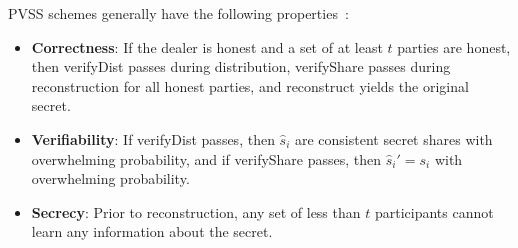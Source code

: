 PVSS schemes generally have the following properties~\cite{pvss_pairings_heidervand}:
\begin{itemize}
    \item \textbf{Correctness}:
    If the dealer is honest and a set of at least $t$ parties are honest, then \textsf{verifyDist} passes during distribution, \textsf{verifyShare} passes during reconstruction for all honest parties, and \textsf{reconstruct} yields the original secret.
    \item \textbf{Verifiability}:
    If \textsf{verifyDist} passes, then $\hat{s}_i$ are consistent secret shares with overwhelming probability, and if \textsf{verifyShare} passes, then $\hat{s}_i'= s_i$ with overwhelming probability.
    \item \textbf{Secrecy}:
    Prior to reconstruction, any set of less than $t$ participants cannot learn any information about the secret.
\end{itemize}